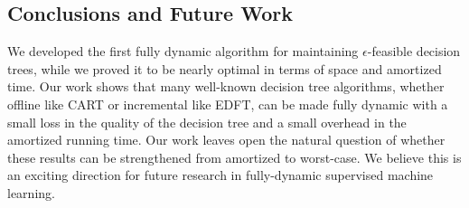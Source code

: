 \subsection{Conclusions and Future Work}
We developed the first fully dynamic algorithm for maintaining $\epsilon$-feasible decision trees, while we proved it to be nearly optimal in terms of space and amortized time. Our work shows that many well-known decision tree algorithms, whether offline like CART or incremental like EDFT, can be made fully dynamic with a small loss in the quality of the decision tree and a small overhead in the amortized running time. Our work leaves open the natural question of whether these results can be strengthened from amortized to worst-case. We believe this is an exciting direction for future research in  fully-dynamic supervised machine learning.

